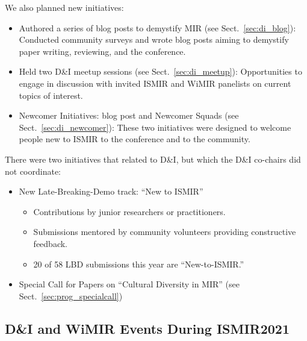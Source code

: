 \documentclass[%
10pt,								%
titlepage,						%
]
{scrartcl}
\begin{document}
        We also planned new initiatives:
        \begin{itemize}
            \item   Authored a series of blog posts to demystify MIR (see Sect.~\ref{sec:di_blog}):
               Conducted community surveys and wrote blog posts aiming to demystify paper writing, reviewing, and the conference.
            \item   Held two D\&I meetup sessions (see Sect.~\ref{sec:di_meetup}):
               Opportunities to engage in discussion with invited ISMIR and WiMIR panelists on current topics of interest. 
            \item   Newcomer Initiatives: blog post and Newcomer Squads (see Sect.~\ref{sec:di_newcomer}):
               These two initiatives were designed to welcome people new to ISMIR to the conference and to the community.
        \end{itemize}


        There were two initiatives that related to D\&I, but which the D\&I co-chairs did not coordinate:
        \begin{itemize}
            \item   New Late-Breaking-Demo track: ``New to ISMIR''
                \begin{itemize}
                    \item   Contributions by junior researchers or practitioners.
                    \item   Submissions mentored by community volunteers providing constructive feedback.
                    \item   20 of 58 LBD submissions this year are ``New-to-ISMIR.''
                \end{itemize}
            \item   Special Call for Papers on ``Cultural Diversity in MIR'' (see Sect.~\ref{sec:prog_specialcall})
        \end{itemize}

    \subsection{D\&I and WiMIR Events During ISMIR2021}
\end{document}
